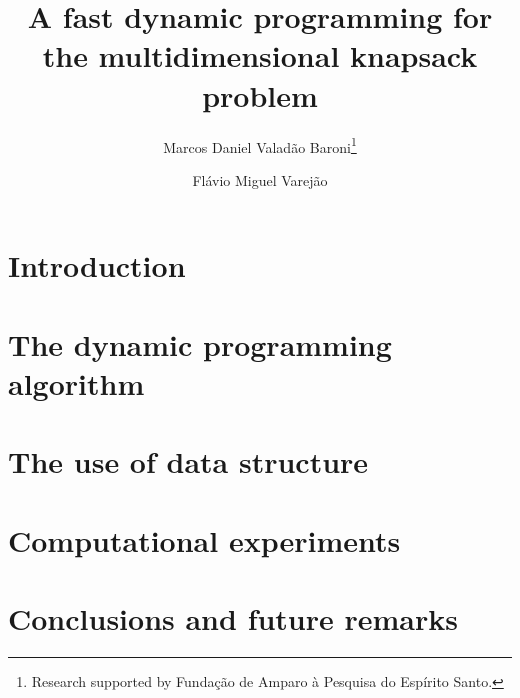 \documentclass{article}
\begin{document}
\title{A fast dynamic programming for
the multidimensional knapsack problem}

\author{
   Marcos Daniel Valad\~ao Baroni\thanks{Research supported by Funda\c c\~ao de Amparo \`a Pesquisa do Esp\'irito Santo.}
   \and
   Fl\'avio Miguel Varej\~ao
}

\maketitle

\begin{abstract}

\end{abstract}

\section{Introduction}
\label{sec:intro}


\section{The dynamic programming algorithm}
\label{sec:dynprog}


\section{The use of data structure}
\label{sec:kdtree}


\section{Computational experiments}
\label{sec:exp}


\section{Conclusions and future remarks}
\label{sec:conc}


%

\end{document}
